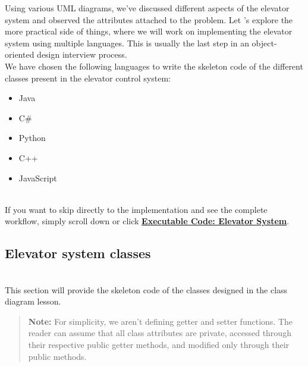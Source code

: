 

Using various UML diagrams, we've discussed different aspects of the elevator system and observed the attributes attached to the problem. Let 's explore the more practical side of things, where we will work on implementing the elevator system using multiple languages. This is usually the last step in an object-oriented design interview process.
\\
We have chosen the following languages to write the skeleton code of the different classes present in the elevator control system:

\begin{itemize}
\item
\protect{}\label{D8UOf5502MmG2mbSxx4C0}
Java
\item
\protect{}\label{AHP0XCVWWx89UAcDp46lW}
C\#
\item
\protect{}\label{4LTyluJGJlxFhUKtP3BrE}
Python
\item
\protect{}\label{64N5Yn2HlbVe_TbIxEAqx}
C++
\item
\protect{}\label{SmxhQgZ7F4-utY_i6i2xd}
JavaScript
\end{itemize}
\\
If you want to skip directly to the implementation and see the complete workflow, simply scroll down or click \hyperref[Executable-code-Elevator-system]{\textbf{Executable Code: Elevator System}}.

\subsection{Elevator system classes}\label{z-ysLR1kV-tb2lKb3NKiE}
\\
This section will provide the skeleton code of the classes designed in the class diagram lesson.
\begin{quote}
\textbf{Note:} For simplicity, we aren't defining getter and setter functions. The reader can assume that all class attributes are private, accessed through their respective public getter methods, and modified only through their public methods.
\end{quote}
